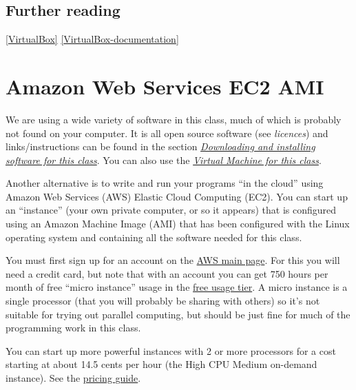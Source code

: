 \documentclass[letterpaper,10pt,english]{sphinxmanual}
\begin{document}
\subsection{Further reading}
\label{vm:further-reading}
{\hyperref[biblio:virtualbox]{{[}VirtualBox{]}}}
{\hyperref[biblio:virtualbox-documentation]{{[}VirtualBox-documentation{]}}}


\section{Amazon Web Services EC2 AMI}
\label{aws:amazon-web-services-ec2-ami}\label{aws:aws}\label{aws::doc}
We are using a wide variety of software in this class, much of which is
probably not found on your computer.  It is all open source software (see
\emph{licences}) and links/instructions
can be found in the section {\hyperref[software_installation:software-installation]{\emph{Downloading and installing software for this class}}}.
You can also use the {\hyperref[vm:vm]{\emph{Virtual Machine for this class}}}.

Another alternative is to write and run your programs ``in the cloud''
using Amazon Web Services (AWS) Elastic Cloud Computing (EC2).
You can start up an ``instance'' (your own private computer, or so it appears)
that is configured using an Amazon Machine Image (AMI) that has been
configured with the Linux operating system and containing
all the software needed for this class.

You must first sign up for an account  on the \href{http://aws.amazon.com/}{AWS main page}.  For this you will need a credit
card, but note that with an account you can get 750 hours per month of
free ``micro instance'' usage in the
\href{http://aws.amazon.com/free/}{free usage tier}.
A micro instance is a single processor (that you will probably be sharing
with others) so it's not suitable for trying out parallel computing, but
should be just fine for much of the programming work in this class.

You can start up more powerful instances with 2 or more processors for a cost
starting at about 14.5 cents per hour (the High CPU Medium on-demand
instance).  See the \href{http://aws.amazon.com/ec2/\#pricing}{pricing guide}.
\end{document}
